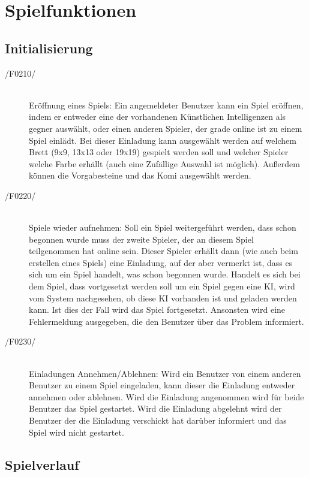 \section{Spielfunktionen}

\subsection{Initialisierung}

\begin{description}
	\item[/F0210/]~\\
		Eröffnung eines Spiels: Ein angemeldeter Benutzer kann ein Spiel eröffnen, indem er entweder eine der vorhandenen Künstlichen Intelligenzen als gegner auswählt, oder einen anderen Spieler, der grade online ist zu einem Spiel einlädt. Bei dieser Einladung kann ausgewählt werden auf welchem Brett (9x9, 13x13 oder 19x19) gespielt werden soll und welcher Spieler welche Farbe erhällt (auch eine Zufällige Auswahl ist möglich). Außerdem können die Vorgabesteine und das Komi ausgewählt werden.
	\item[/F0220/]~\\
		Spiele wieder aufnehmen: Soll ein Spiel weitergeführt werden, dass schon begonnen wurde muss der zweite Spieler, der an diesem Spiel teilgenommen hat online sein. Dieser Spieler erhällt dann (wie auch beim erstellen eines Spiels) eine Einladung, auf der aber vermerkt ist, dass es sich um ein Spiel handelt, was schon begonnen wurde. Handelt es sich bei dem Spiel, dass vortgesetzt werden soll um ein Spiel gegen eine KI, wird vom System nachgesehen, ob diese KI vorhanden ist und geladen werden kann. Ist dies der Fall wird das Spiel fortgesetzt. Ansonsten wird eine Fehlermeldung ausgegeben, die den Benutzer über das Problem informiert.
	\item[/F0230/]~\\
		Einladungen Annehmen/Ablehnen: Wird ein Benutzer von einem anderen Benutzer zu einem Spiel eingeladen, kann dieser die Einladung entweder annehmen oder ablehnen. Wird die Einladung angenommen wird für beide Benutzer das Spiel gestartet. Wird die Einladung abgelehnt wird der Benutzer der die Einladung verschickt hat darüber informiert und das Spiel wird nicht gestartet.
\end{description}

\subsection{Spielverlauf}

